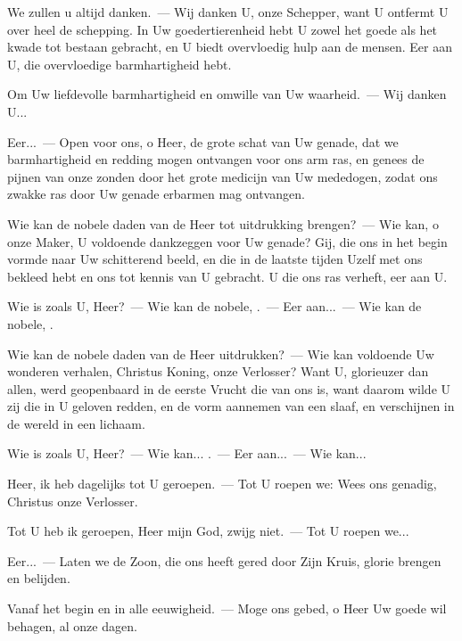 \documentclass[12pt,twoside,a5paper]{article}
\begin{document}
\begin{halfparskip}
   We zullen u altijd danken.~--- Wij danken U, onze Schepper, want U ontfermt U over heel de schepping. In Uw goedertierenheid hebt U zowel het goede als het kwade tot bestaan gebracht, en U biedt overvloedig hulp aan de mensen. Eer aan U, die overvloedige barmhartigheid hebt.

  Om Uw liefdevolle barmhartigheid en omwille van Uw waarheid.~--- Wij danken U...

  Eer...~--- Open voor ons, o Heer, de grote schat van Uw genade, dat we barmhartigheid en redding mogen ontvangen voor ons arm ras, en genees de pijnen van onze zonden door het grote medicijn van Uw mededogen, zodat ons zwakke ras door Uw genade erbarmen mag ontvangen.
\end{halfparskip}

\begin{halfparskip}
   Wie kan de nobele daden van de Heer tot uitdrukking brengen?~--- Wie kan, o onze Maker, U voldoende dankzeggen voor Uw genade? Gij, die ons in het begin vormde naar Uw schitterend beeld, en die in de laatste tijden Uzelf met ons bekleed hebt en ons tot kennis van U gebracht. U die ons ras verheft, eer aan U.

  Wie is zoals U, Heer?~--- Wie kan de nobele, .~--- Eer aan...~--- Wie kan de nobele, .
\end{halfparskip}

\begin{halfparskip}
   Wie kan de nobele daden van de Heer uitdrukken?~--- Wie kan voldoende Uw wonderen verhalen, Christus Koning, onze Verlosser? Want U, glorieuzer dan allen, werd geopenbaard in de eerste Vrucht die van ons is, want daarom wilde U zij die in U geloven redden, en de vorm aannemen van een slaaf, en verschijnen in de wereld in een lichaam.

  Wie is zoals U, Heer?~--- Wie kan... .~--- Eer aan...~--- Wie kan...
\end{halfparskip}

\begin{halfparskip}
   Heer, ik heb dagelijks tot U geroepen.~--- Tot U roepen we: Wees ons genadig, Christus onze Verlosser.

  Tot U heb ik geroepen, Heer mijn God, zwijg niet.~--- Tot U roepen we...

  Eer...~--- Laten we de Zoon, die ons heeft gered door Zijn Kruis, glorie brengen en belijden.

  Vanaf het begin en in alle eeuwigheid.~--- Moge ons gebed, o Heer Uw goede wil behagen, al onze dagen.
\end{halfparskip}
\end{document}
